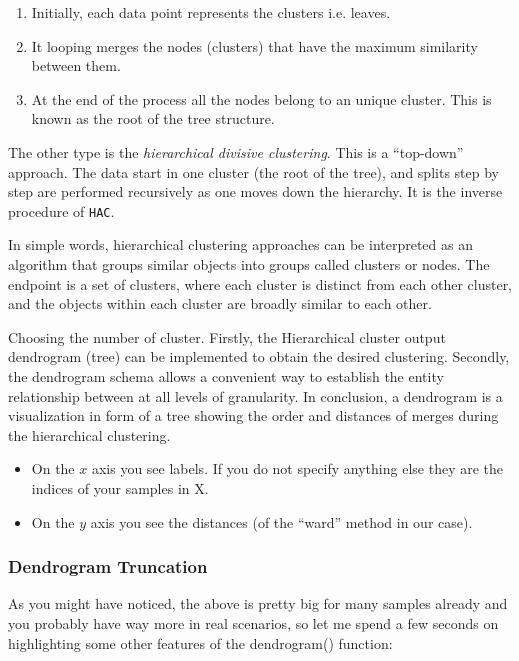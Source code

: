 \documentclass[fleqn,usenatbib]{mnras}
\begin{document}
\begin{enumerate}
\item Initially, each data point represents the clusters i.e. leaves.
\item It looping merges the nodes (clusters) that have the maximum similarity
  between them.
\item At the end of the process all the nodes belong to an unique cluster. This is
  known as the root of the tree structure.
 \end{enumerate}

The other type is the \textit{hierarchical divisive clustering}. This is a ``top-down''
approach. The data start in one cluster (the root of the tree), and splits step by step
are performed recursively as one moves down the hierarchy. It is the inverse procedure
of \texttt{HAC}.

In simple words, hierarchical clustering approaches can be interpreted  as an
algorithm that groups similar objects into groups called clusters or nodes.
The endpoint is a set of clusters, where each cluster is distinct from each other cluster,
and the objects within each cluster are broadly similar to each other.


Choosing the number of cluster. Firstly, the Hierarchical cluster output dendrogram (tree)
can be implemented to obtain the desired clustering. Secondly, the dendrogram schema allows
a convenient way to establish the entity relationship between at all levels of granularity.
In conclusion, a dendrogram is a visualization in form of a tree showing the order
and distances of merges during the hierarchical clustering.

\begin{itemize}
  
     \item On the $x$ axis you see labels. If you do not specify anything else they
       are the indices of your samples in X.
     \item On the $y$ axis you see the distances (of the ``ward'' method in our case).
       
\end{itemize}


\subsubsection{Dendrogram Truncation}

As you might have noticed, the above is pretty big for many samples already and you
probably have way more in real scenarios, so let me spend a few seconds on highlighting
some other features of the dendrogram() function:
\end{document}
